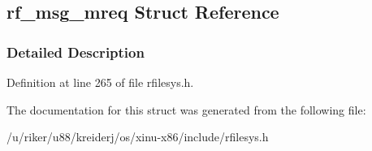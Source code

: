 \hypertarget{structrf__msg__mreq}{}\subsection{rf\+\_\+msg\+\_\+mreq Struct Reference}
\label{structrf__msg__mreq}


\subsubsection{Detailed Description}


Definition at line 265 of file rfilesys.\+h.



The documentation for this struct was generated from the following file\+:\begin{DoxyCompactItemize}
\item 
/u/riker/u88/kreiderj/os/xinu-\/x86/include/rfilesys.\+h\end{DoxyCompactItemize}
